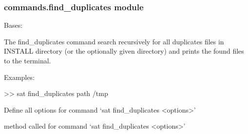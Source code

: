 \documentclass[a4paper,10pt,english]{sphinxmanual}
\begin{document}
\subsubsection{commands.find\_duplicates module}
\label{\detokenize{apidoc_commands/commands:module-commands.find_duplicates}}\label{\detokenize{apidoc_commands/commands:commands-find-duplicates-module}}

\begin{fulllineitems}
\label{\detokenize{apidoc_commands/commands:commands.find_duplicates.Command}}
Bases: 

The find\_duplicates command search recursively for all duplicates files
in INSTALL directory (or the optionally given directory) and 
prints the found files to the terminal.

\begin{DUlineblock}{0em}
\item[] Examples:
\item[] \textgreater{}\textgreater{} sat find\_duplicates \textendash{}path /tmp
\end{DUlineblock}

\begin{fulllineitems}
\label{\detokenize{apidoc_commands/commands:commands.find_duplicates.Command.getParser}}
Define all options for command ‘sat find\_duplicates \textless{}options\textgreater{}’

\end{fulllineitems}


\begin{fulllineitems}
\label{\detokenize{apidoc_commands/commands:commands.find_duplicates.Command.name}}
\end{fulllineitems}


\begin{fulllineitems}
\label{\detokenize{apidoc_commands/commands:commands.find_duplicates.Command.run}}
method called for command ‘sat find\_duplicates \textless{}options\textgreater{}’

\end{fulllineitems}


\end{fulllineitems}
\end{document}
